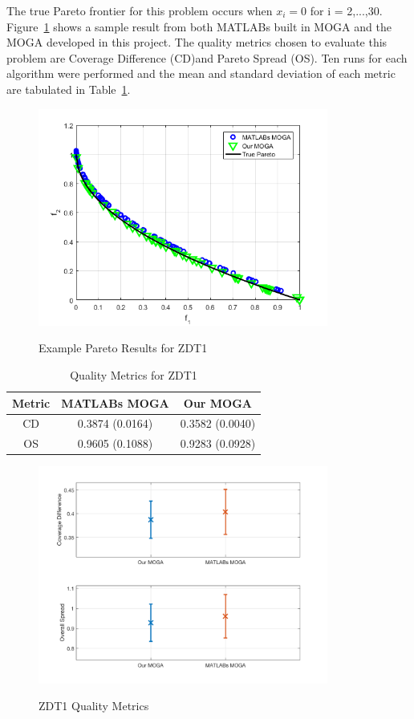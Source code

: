 \documentclass{article}
\begin{document}
\noindent The true Pareto frontier for this problem occurs when $x_i = 0$ for i = 2,...,30. Figure~\ref{fig:ZDT1} shows a sample result from both MATLABs built in MOGA and the MOGA developed in this project. The quality metrics chosen to evaluate this problem are Coverage Difference (CD)and Pareto Spread (OS). Ten runs for each algorithm were performed and the mean and standard deviation of each metric are tabulated in Table~\ref{tab:ZDT1}.


\begin{figure}[h]
  \caption{Example Pareto Results for ZDT1}
  \centering
  \includegraphics[width=0.85\textwidth]{ZDT1_pareto_final.png}  
  \label{fig:ZDT1}
\end{figure}

\begin{table}[h]
\caption{Quality Metrics for ZDT1} 
\centering 
\begin{tabular}{|c|c|c|} 
\hline\hline  
Metric & MATLABs MOGA & Our MOGA \\ \hline
CD & 0.3874 (0.0164) &  0.3582 (0.0040) \\ \hline
OS & 0.9605 (0.1088) & 0.9283 (0.0928) \\ \hline
\end{tabular}
\label{tab:ZDT1} 
\end{table}
\begin{figure}[h]
  \caption{ZDT1 Quality Metrics}
  \centering
  \includegraphics[width=0.85\textwidth]{ZDT1_QM.png}  
  \label{fig:ZDT1_QM}
\end{figure}
\end{document}
